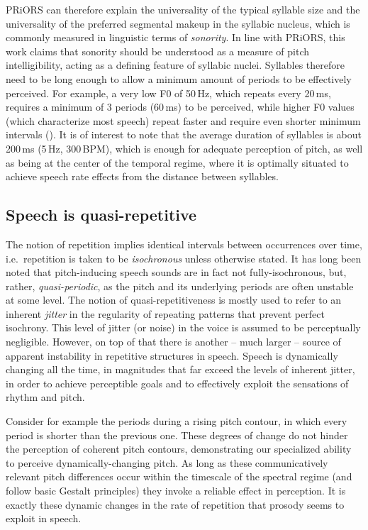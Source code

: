 PRiORS can therefore explain the universality of the typical syllable size and the universality of the preferred segmental makeup in the syllabic nucleus, which is commonly measured in linguistic terms of \emph{sonority}.
In line with PRiORS, this work claims that sonority should be understood as a measure of pitch intelligibility, acting as a defining feature of syllabic nuclei.
Syllables therefore need to be long enough to allow a minimum amount of periods to be effectively perceived.
For example, a very low F0 of 50\,Hz, which repeats every 20\,ms, requires a minimum of 3 periods (60\,ms) to be perceived, while higher F0 values (which characterize most speech) repeat faster and require even shorter minimum intervals (\citealt{fyk1987duration, josephs1967thephysics}). It is of interest to note that the average duration of syllables is about 200\,ms (5\,Hz, 300\,BPM), which is enough for adequate perception of pitch, as well as being at the center of the temporal regime, where it is optimally situated to achieve speech rate effects from the distance between syllables.

\subsection{Speech is quasi-repetitive}\label{sec:quasi}

The notion of repetition implies identical intervals between occurrences over time, i.e.~repetition is taken to be \emph{isochronous} unless otherwise stated. It has long been noted that pitch-inducing speech sounds are in fact not fully-isochronous, but, rather, \emph{quasi-periodic}, as the pitch and its underlying periods are often unstable at some level.
The notion of quasi-repetitiveness is mostly used to refer to an inherent \emph{jitter} in the regularity of repeating patterns that prevent perfect isochrony. This level of jitter (or noise) in the voice is assumed to be perceptually negligible.
However, on top of that there is another -- much larger -- source of apparent instability in repetitive structures in speech.
Speech is dynamically changing all the time, in magnitudes that far exceed the levels of inherent jitter, in order to achieve perceptible goals and to effectively exploit the sensations of rhythm and pitch.

Consider for example the periods during a rising pitch contour, in which every period is shorter than the previous one.
These degrees of change do not hinder the perception of coherent pitch contours, demonstrating our specialized ability to perceive dynamically-changing pitch.
As long as these communicatively relevant pitch differences occur within the timescale of the spectral regime
(and follow basic Gestalt principles)
they invoke a reliable effect in perception.
It is exactly these dynamic changes in the rate of repetition that prosody seems to exploit in speech.

